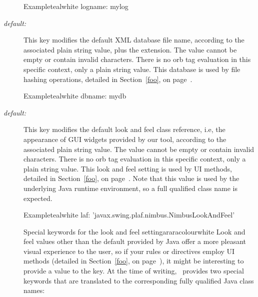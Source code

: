 \begin{description}
\begin{codebox}{Example}{teal}{\icnote}{white}
logname: mylog
\end{codebox}

\item[\describecf{O}{string}{dbname}\hfill {\normalfont\itshape default:} \rbox{arara}] This key modifies the default XML database file name, according to the associated plain string value, plus the  extension. The value cannot be empty or contain invalid characters. There is no orb tag evaluation in this specific context, only a plain string value. This database is used by file hashing operations, detailed in Section~\ref{foo}, on page~\pageref{foo}.

\begin{codebox}{Example}{teal}{\icnote}{white}
dbname: mydb
\end{codebox}

\item[\describecf{O}{string}{laf}\hfill {\normalfont\itshape default:} \rbox{none}] This key modifies the default look and feel class reference, i.e,  the appearance of GUI widgets provided by our tool, according to the associated plain string value. The value cannot be empty or contain invalid characters. There is no orb tag evaluation in this specific context, only a plain string value. This look and feel setting is used by UI methods, detailed in Section~\ref{foo}, on page~\pageref{foo}. Note that this value is used by the underlying Java runtime environment, so a full qualified class name is expected.

\begin{codebox}{Example}{teal}{\icnote}{white}
laf: 'javax.swing.plaf.nimbus.NimbusLookAndFeel'
\end{codebox}

\begin{messagebox}{Special keywords for the look and feel setting}{araracolour}{\icok}{white}
Look and feel values other than the default provided by Java offer a more pleasant visual experience to the user, so if your rules or directives employ UI methods (detailed in Section~\ref{foo}, on page~\pageref{foo}), it might be interesting to provide a value to the  key. At the time of writing, \arara\ provides two special keywords that are translated to the corresponding fully qualified Java class names:

\vspace{1em}


\end{messagebox}
\end{description}
